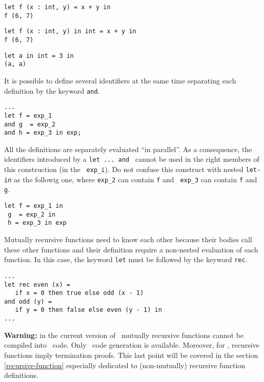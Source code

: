 {\scriptsize
\begin{lstlisting}
let f (x : int, y) = x + y in
f (6, 7)
\end{lstlisting}
}
{\scriptsize
\begin{lstlisting}
let f (x : int, y) in int = x + y in
f (6, 7)
\end{lstlisting}
}
{\scriptsize
\begin{lstlisting}
let a in int = 3 in
(a, a)
\end{lstlisting}
}



\medskip
It is possible to define several identifiers at the same time separating
each definition by the keyword {\tt and}.
{\scriptsize
\begin{lstlisting}
...
let f = exp_1
and g  = exp_2
and h = exp_3 in exp;
\end{lstlisting}
}

All the definitions are separately evaluated ``in parallel''.  As a
consequence, the identifiers introduced by a {\tt let ... and }
cannot be used in the right members of this construction (in the {\tt
  exp\_i}). Do not confuse this construct with nested {\tt let-in} as
the followig one, where {\tt exp\_2} can contain {\tt f} and {\tt
  exp\_3} can contain {\tt f} and {\tt g}.

{\scriptsize
\begin{lstlisting}
let f = exp_1 in
 g  = exp_2 in
 h = exp_3 in exp
\end{lstlisting}
}

Mutually recursive functions need to know each other because their
bodies call these other functions and their definition require a
non-nested evaluation of each function.  In this case, the keyword
{\tt let} must be followed by the keyword {\tt rec}.

{\scriptsize
\begin{lstlisting}
...
let rec even (x) =
   if x = 0 then true else odd (x - 1)
and odd (y) =
   if y = 0 then false else even (y - 1) in
...
\end{lstlisting}
}

{\large {\bf Warning:}} in the current version of \focal\ mutually
recursive functions cannot be compiled into \coq\ code. Only
\ocaml\ code generation is available. Moreover, for \coq, recursive
functions imply termination proofs. This last point will be covered in
the section \ref{recursive-function} especially dedicated to
(non-mutually) recursive function definitions.



